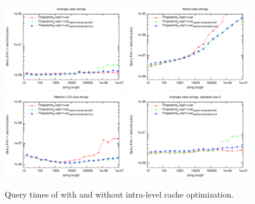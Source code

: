 \documentclass[a4]{article}
\begin{document}
\begin{figure}[tp]
    \begin{center}
        \includegraphics[width=0.49\textwidth,type=pdf,ext=.pdf,read=.pdf]{../src/results/length-fingerprint-cache-rand10.plt}
        \includegraphics[width=0.49\textwidth,type=pdf,ext=.pdf,read=.pdf]{../src/results/length-fingerprint-cache-alla.plt}
        \includegraphics[width=0.49\textwidth,type=pdf,ext=.pdf,read=.pdf]{../src/results/length-fingerprint-cache-repeat-pow.plt}
        \includegraphics[width=0.49\textwidth,type=pdf,ext=.pdf,read=.pdf]{../src/results/length-fingerprint-cache-rand2.plt}
    \end{center}
    \caption{\label{fig:plot-fingerprint-cache-horiz}Query times of \fprint[2] with and without intra-level cache optimization.}
\end{figure}
\end{document}
